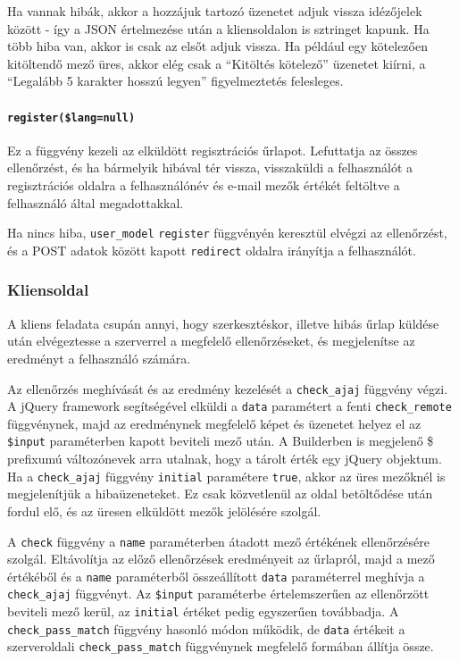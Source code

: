 \documentclass[12pt,a4paper,twoside]{article}
\begin{document}
Ha vannak hibák, akkor a hozzájuk tartozó üzenetet adjuk vissza idézőjelek
között - így a JSON értelmezése után a kliensoldalon is sztringet kapunk. Ha
több hiba van, akkor is csak az elsőt adjuk vissza. Ha például egy kötelezően
kitöltendő mező üres, akkor elég csak a ``Kitöltés kötelező'' üzenetet kiírni, a
``Legalább 5 karakter hosszú legyen'' figyelmeztetés felesleges.


\paragraph{\texttt{register(\$lang=null)}}
Ez a függvény kezeli az elküldött regisztrációs űrlapot. Lefuttatja az összes
ellenőrzést, és ha bármelyik hibával tér vissza, visszaküldi a felhasználót a
regisztrációs oldalra a felhasználónév és e-mail mezők értékét feltöltve a
felhasználó által megadottakkal.

Ha nincs hiba, \texttt{user\_model} \texttt{register} függvényén keresztül
elvégzi az ellenőrzést, és a POST adatok között kapott \texttt{redirect} oldalra
irányítja a felhasználót.


\subsubsection{Kliensoldal}
\label{sec:reg-client}

A kliens feladata csupán annyi, hogy szerkesztéskor, illetve hibás űrlap küldése
után elvégeztesse a szerverrel a megfelelő ellenőrzéseket, és megjelenítse az
eredményt a felhasználó számára.

Az ellenőrzés meghívását és az eredmény kezelését a \texttt{check\_ajaj}
függvény végzi. A jQuery framework segítségével elküldi a \texttt{data}
paramétert a fenti \texttt{check\_remote} függvénynek, majd az eredménynek
megfelelő képet és üzenetet helyez el az \texttt{\$input} paraméterben kapott
beviteli mező után. A Builderben is megjelenő \$ prefixumú változónevek arra
utalnak, hogy a tárolt érték egy jQuery objektum. Ha a \texttt{check\_ajaj}
függvény \texttt{initial} paramétere \texttt{true}, akkor az üres mezőknél is
megjelenítjük a hibaüzeneteket. Ez csak közvetlenül az oldal betöltődése után
fordul elő, és az üresen elküldött mezők jelölésére szolgál.

A \texttt{check} függvény a \texttt{name} paraméterben átadott mező értékének
ellenőrzésére szolgál. Eltávolítja az előző ellenőrzések eredményeit az
űrlapról, majd a mező értékéből és a \texttt{name} paraméterből összeállított
\texttt{data} paraméterrel meghívja a \texttt{check\_ajaj} függvényt. Az
\texttt{\$input} paraméterbe értelemszerűen az ellenőrzött beviteli mező kerül,
az \texttt{initial} értéket pedig egyszerűen továbbadja. A
\texttt{check\_pass\_match} függvény hasonló módon működik, de \texttt{data}
értékeit a szerveroldali \texttt{check\_pass\_match} függvénynek megfelelő
formában állítja össze.
\end{document}
